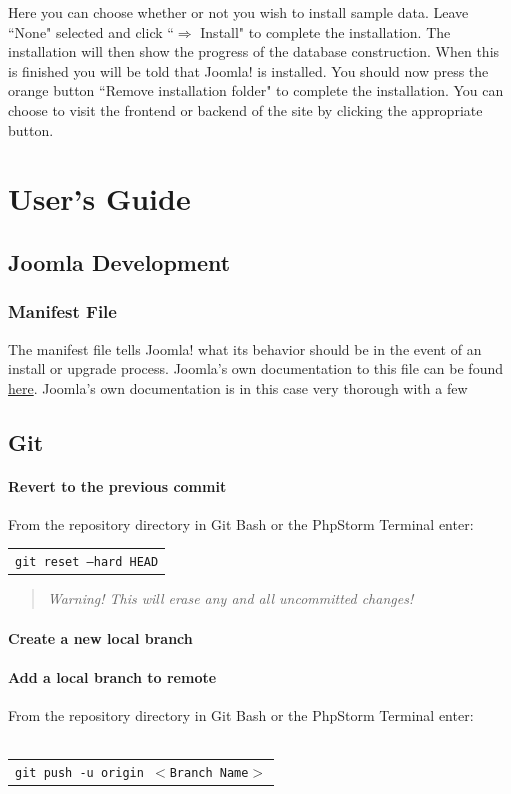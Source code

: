 \documentclass[]{report}
\begin{document}
\noindent
Here you can choose whether or not you wish to install sample data. Leave ``None" selected and click ``$\Rightarrow$ Install" to complete the installation. The installation will then show the progress of the database construction. When this is finished you will be told that Joomla! is installed. You should now press the orange button ``Remove installation folder" to complete the installation. You can choose to visit the frontend or backend of the site by clicking the appropriate button.

\chapter{User's Guide}

\section{Joomla Development}

\subsection{Manifest File}

The manifest file tells Joomla! what its behavior should be in the event of an install or upgrade process. Joomla's own documentation to this file can be found \href{http://docs.joomla.org/Manifest_files}{here}. Joomla's own documentation is in this case very thorough with a few 



\section{Git}

\subsubsection{Revert to the previous commit}
From the repository directory in Git Bash or the PhpStorm Terminal enter:\\

\begin{tabular}{l}
	\texttt{git reset --hard HEAD}\\
\end{tabular}

\begin{quote}
	\emph{Warning! This will erase any and all uncommitted changes!}
\end{quote}

\subsubsection{Create a new local branch}

\subsubsection{Add a local branch to remote}
From the repository directory in Git Bash or the PhpStorm Terminal enter:\\
\\
\begin{tabular}{l}
	\texttt{git push -u origin $<$Branch Name$>$}
\end{tabular}
\end{document}
